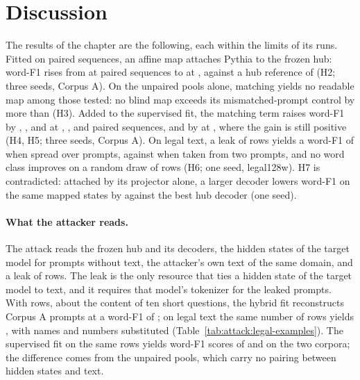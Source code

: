 \section{Discussion}\label{sec:attack:discussion}

The results of the chapter are the following, each within the limits of its runs.
Fitted on paired sequences, an affine map attaches Pythia to the frozen hub: word-F1 rises from  at  paired sequences to  at , against a hub reference of  (H2; three seeds, Corpus A). %
On the unpaired pools alone, matching yields no readable map among those tested: no blind map exceeds its mismatched-prompt control by more than  (H3).
Added to the supervised fit, the matching term raises word-F1 by , , and  at , , and  paired sequences, and by  at , where the gain is still positive (H4, H5; three seeds, Corpus A). %
On legal text, a leak of  rows yields a word-F1 of  when spread over  prompts, against  when taken from two prompts, and no word class improves on a random draw of rows (H6; one seed, legal128w). %
H7 is contradicted: attached by its projector alone, a larger decoder lowers word-F1 on the same mapped states by  against the best hub decoder (one seed). %

\paragraph{What the attacker reads.} The attack reads the frozen hub and its decoders, the hidden states of the target model for prompts without text, the attacker's own text of the same domain, and a leak of rows.
The leak is the only resource that ties a hidden state of the target model to text, and it requires that model's tokenizer for the leaked prompts.
With  rows, about the content of ten short questions, the hybrid fit reconstructs Corpus A prompts at a word-F1 of ; on legal text the same number of rows yields , with names and numbers substituted (Table~\ref{tab:attack:legal-examples}). %
The supervised fit on the same rows yields word-F1 scores of  and  on the two corpora; the difference comes from the unpaired pools, which carry no pairing between hidden states and text. %

